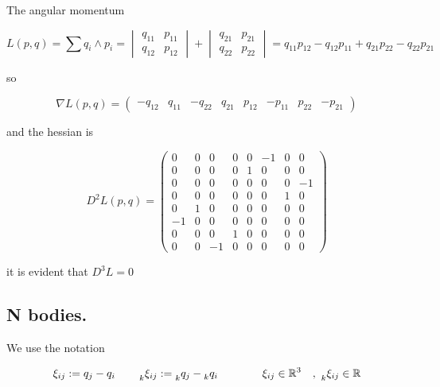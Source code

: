 \documentclass[12pt]{article}
\begin{document}
The angular momentum 

\begin{equation}\label{eq:angular momentum kepler}
    L(p,q) = \sum q_i\wedge p_i = \begin{vmatrix} q_{11} & p_{11}\\ q_{12} & p_{12} \end{vmatrix} + \begin{vmatrix} q_{21} & p_{21}\\ q_{22} & p_{22} \end{vmatrix} = q_{11}p_{12} - q_{12}p_{11} + q_{21}p_{22} - q_{22}p_{21}
\end{equation}

so 

\begin{equation}\label{eq:nabla l kepler}
    \nabla L(p,q) = 
    \begin{pmatrix} 
    -q_{12} & q_{11} & -q_{22} & q_{21} &
    p_{12} & -p_{11} & p_{22} & -p_{21}
    \end{pmatrix}
\end{equation}

and the hessian is

\begin{equation}\label{eq:hessian of angular momentum kepler}
D^2L(p,q) = 
\left(\begin{array}{cccc|cccc}
    0 & 0 & 0 & 0    &    0 & -1 & 0 & 0\\
    0 & 0 & 0 & 0    &    1 & 0 & 0 & 0\\
    0 & 0 & 0 & 0    &    0 & 0 & 0 & -1\\
    0 & 0 & 0 & 0    &    0 & 0 & 1 & 0\\
    \hline
    0 & 1 & 0 & 0    &    0 & 0 & 0 & 0\\
    -1 & 0 & 0 & 0    &    0 & 0 & 0 & 0\\
    0 & 0 & 0 & 1    &    0 & 0 & 0 & 0\\
    0 & 0 & -1 & 0    &    0 & 0 & 0 & 0
\end{array}\right)
\end{equation}

it is evident that $D^3L =0$


\subsection{N bodies.}
We use the notation 

$$
\xi_{ij} := q_j - q_i \qquad \prescript{}{k}{\xi_{ij}} := \prescript{}{k}{q_j} - \prescript{}{k}{q_i} \qquad\qquad \xi_{ij}\in\mathbb{R}^3\quad,\,\, \prescript{}{k}{\xi_{ij}} \in \mathbb{R}
$$
\end{document}
